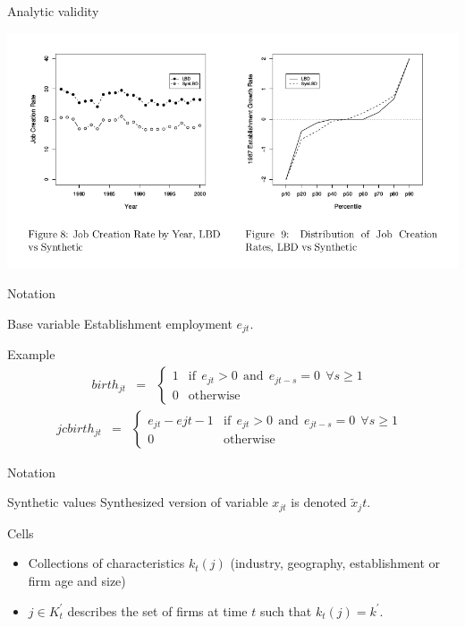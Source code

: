 \begin{frame}{Analytic validity}
\begin{center}
\includegraphics[width=\textwidth]{./CES-WP-11-04-page39-hilite}
\end{center}
\end{frame}




\begin{frame}{Notation}

\begin{block}{Base variable}
Establishment employment $e_{jt}$. 
\end{block}
\begin{block}{Example}
\begin{eqnarray}
\label{eq:e_birth}
birth_{jt} &=& \left \lbrace 
\begin{array}{rl}
1 &\mbox{if}~~  e_{jt} > 0 ~~ \mbox{and}  ~~e_{jt-s} = 0 ~~\forall s\geq 1~~\\
0 &\mbox{otherwise}
\end{array} \right .
\end{eqnarray}
\begin{eqnarray}
\label{eq:e_birth}
jcbirth_{jt} &=& \left \lbrace 
\begin{array}{rl}
e_{jt}-e{jt-1} &\mbox{if}~~  e_{jt} > 0 ~~ \mbox{and}  ~~e_{jt-s} = 0 ~~\forall s\geq 1~~\\
0 &\mbox{otherwise}
\end{array} \right .
\end{eqnarray}
\end{block}
\end{frame}

\begin{frame}{Notation}
\begin{block}{Synthetic values}
Synthesized version of variable $x_{jt}$ is 
denoted $\tilde{x}_jt$. 
\end{block}
\begin{block}{Cells}
\begin{itemize}
\item[]
Collections of characteristics $k_t(j)$ (industry, geography, establishment or firm age and size)
\item[]  $j \in 
K_t^\prime$ describes the set of firms at time $t$ such that $k_t(j)=k^\prime$.  

\end{itemize}
\end{block}
\end{frame}

